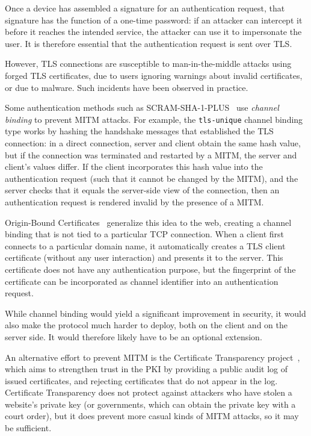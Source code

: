 Once a device has assembled a signature for an authentication request, that signature has the
function of a one-time password: if an attacker can intercept it before it reaches the intended
service, the attacker can use it to impersonate the user. It is therefore essential that the
authentication request is sent over TLS.

However, TLS connections are susceptible to man-in-the-middle attacks using forged TLS certificates,
due to users ignoring warnings about invalid certificates, or due to malware. Such incidents have
been observed in practice.~\cite{Huang14, Adkins11}

Some authentication methods such as SCRAM-SHA-1-PLUS~\cite{SCRAM} use \emph{channel binding} to
prevent MITM attacks. For example, the \texttt{tls-unique} channel binding type works by hashing the
handshake messages that established the TLS connection: in a direct connection, server and client
obtain the same hash value, but if the connection was terminated and restarted by a MITM, the server
and client's values differ. If the client incorporates this hash value into the authentication
request (such that it cannot be changed by the MITM), and the server checks that it equals the
server-side view of the connection, then an authentication request is rendered invalid by the
presence of a MITM.

Origin-Bound Certificates~\cite{Dietz12} generalize this idea to the web, creating a channel
binding that is not tied to a particular TCP connection. When a client first connects to a
particular domain name, it automatically creates a TLS client certificate (without any user
interaction) and presents it to the server. This certificate does not have any authentication
purpose, but the fingerprint of the certificate can be incorporated as channel identifier into an
authentication request.

While channel binding would yield a significant improvement in security, it would also make the
protocol much harder to deploy, both on the client and on the server side. It would therefore likely
have to be an optional extension.

An alternative effort to prevent MITM is the Certificate Transparency project~\cite{CertTrans},
which aims to strengthen trust in the PKI by providing a public audit log of issued certificates,
and rejecting certificates that do not appear in the log. Certificate Transparency does not protect
against attackers who have stolen a website's private key (or governments, which can obtain the
private key with a court order), but it does prevent more casual kinds of MITM attacks, so it may be
sufficient.
